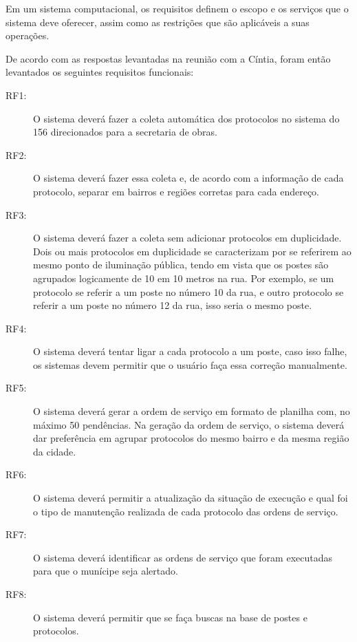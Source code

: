 \documentclass[
	article,			%
	11pt,				%
	oneside,			%
	a4paper,			%
	english,			%
	brazil,				%
	sumario=tradicional
	]{abntex2}
\begin{document}
Em um sistema computacional, os requisitos definem o escopo e os serviços que o
sistema deve oferecer, assim como as restrições que são aplicáveis a suas
operações.

De acordo com as respostas levantadas na reunião com a Cíntia, foram então levantados os seguintes requisitos funcionais:

\begin{description}
\item[RF1:] O sistema deverá fazer a coleta automática dos protocolos no sistema do 156
direcionados para a secretaria de obras.
\item[RF2:] O sistema deverá fazer essa coleta e, de acordo com a informação de cada
protocolo, separar em bairros e regiões corretas para cada endereço.
\item[RF3:] O sistema deverá fazer a coleta sem adicionar protocolos em duplicidade.
Dois ou mais protocolos em duplicidade se caracterizam por se referirem ao
mesmo ponto de iluminação pública, tendo em vista que os postes são agrupados
logicamente de 10 em 10 metros na rua. Por exemplo, se um protocolo se referir
a um poste no número 10 da rua, e outro protocolo se referir a um poste no número
12 da rua, isso seria o mesmo poste.
\item[RF4:] O sistema deverá tentar ligar a cada protocolo a um poste, caso isso falhe,
os sistemas devem permitir que o usuário faça essa correção manualmente.
\item[RF5:] O sistema deverá gerar a ordem de serviço em formato de planilha com,
no máximo 50 pendências. Na geração da ordem de serviço, o sistema deverá
dar preferência em agrupar protocolos do mesmo bairro e da mesma região da cidade.
\item[RF6:] O sistema deverá permitir a atualização da situação de execução e qual foi
o tipo de manutenção realizada de cada protocolo das ordens de serviço.
\item[RF7:] O sistema deverá identificar as ordens de serviço que foram executadas para
que o munícipe seja alertado.
\item[RF8:] O sistema deverá permitir que se faça buscas na base de postes e protocolos.
\end{description}


\end{document}
